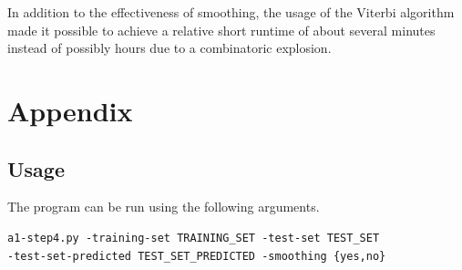 \documentclass[titlepage,a4paper, 10pt]{article}
\begin{document}
In addition to the effectiveness of smoothing, the usage of the Viterbi algorithm made it  possible to achieve a relative short runtime of about several minutes instead of possibly hours due to a combinatoric explosion.

\newpage
\section*{Appendix}

\subsection*{Usage}
The program can be run using the following arguments.

\begin{lstlisting}[breaklines]
a1-step4.py -training-set TRAINING_SET -test-set TEST_SET 
-test-set-predicted TEST_SET_PREDICTED -smoothing {yes,no}   
\end{lstlisting}
\end{document}
